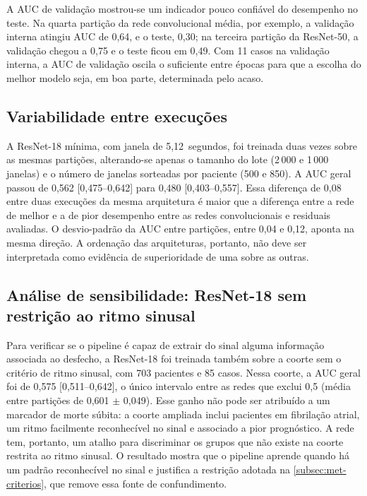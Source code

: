 A \gls{AUC} de validação mostrou-se um indicador pouco confiável do
desempenho no teste. Na quarta partição da rede convolucional média, por
exemplo, a validação interna atingiu \gls{AUC} de 0,64, e o teste, 0,30; na
terceira partição da ResNet-50, a validação chegou a 0,75 e o teste ficou em
0,49. Com 11 casos na validação interna, a \gls{AUC} de validação oscila o
suficiente entre épocas para que a escolha do melhor modelo seja, em boa
parte, determinada pelo acaso.

\subsection{Variabilidade entre execuções}
\label{subsec:res-redes-reprodutibilidade}

A ResNet-18 mínima, com janela de 5,12~segundos, foi treinada duas vezes
sobre as mesmas partições, alterando-se apenas o tamanho do lote (2\,000 e
1\,000 janelas) e o número de janelas sorteadas por paciente (500 e 850). A
\gls{AUC} geral passou de 0,562 [0,475--0,642] para 0,480
[0,403--0,557]. Essa diferença de 0,08 entre duas execuções da mesma
arquitetura é maior que a diferença entre a rede de melhor e a de pior
desempenho entre as redes convolucionais e residuais avaliadas.
O desvio-padrão da \gls{AUC} entre partições, entre 0,04 e 0,12, aponta na
mesma direção. A ordenação das arquiteturas, portanto, não deve ser
interpretada como evidência de superioridade de uma sobre as outras.


\subsection{Análise de sensibilidade: ResNet-18 sem restrição ao ritmo sinusal}
\label{subsec:res-redes-ritmo}

Para verificar se o pipeline é capaz de extrair do sinal alguma informação
associada ao desfecho, a ResNet-18 foi treinada também sobre a coorte sem o
critério de ritmo sinusal, com 703 pacientes e 85 casos. Nessa coorte, a
\gls{AUC} geral foi de 0,575 [0,511--0,642], o único intervalo
entre as redes que exclui 0,5 (média entre partições de 0,601 $\pm$ 0,049).
Esse ganho não pode ser atribuído a um marcador de morte súbita: a coorte
ampliada inclui pacientes em fibrilação atrial, um ritmo facilmente
reconhecível no sinal e associado a pior prognóstico. A rede tem, portanto,
um atalho para discriminar os grupos que não existe na coorte restrita ao
ritmo sinusal. O resultado mostra que o pipeline aprende quando há um padrão
reconhecível no sinal e justifica a restrição adotada na
\autoref{subsec:met-criterios}, que remove essa fonte de confundimento.

